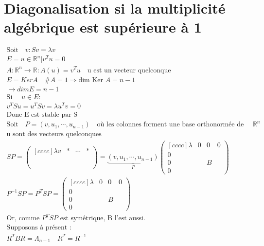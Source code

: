 \documentclass[a4paper]{book}
\begin{document}
\section{Diagonalisation si la multiplicité algébrique est supérieure à 1}
\begin{gather*}
    \text{Soit} \quad v : Sv = \lambda v \\
    E = {u \in \mathbb{R}^n | v^Tu = 0} \\
    A : \mathbb{R}^n \rightarrow \mathbb{R} : A(u) = v^Tu \quad \text{u est un vecteur quelconque} \\
    E = Ker A \quad \#A = 1 \Rightarrow \text{dim Ker } A = n-1 \\
    \rightarrow dim E = n-1 \\
    \text{Si } \quad u \in E : \\
    v^TSu = u^TSv = \lambda u^Tv = 0 \\
    \text{Donc E est stable par S} \\
    \text{Soit} \quad P = (v,u_1,\cdots,u_{n-1}) \quad \text{où les colonnes forment une base orthonormée de } \quad \mathbb{R}^n \\
    \text{u sont des vecteurs quelconques} \\
    SP = \begin{pmatrix}[cccc]
    \lambda v & * &\cdots &*\\
    \\
    \\
    \\
    \end{pmatrix} = \underbrace{(v,u_1,\cdots,u_{n-1})}_P\begin{pmatrix}[cccc]
    \lambda & 0 & 0 & 0 \\
    0&&& \\
    0&&B&\\
    0&&&
    \end{pmatrix} \\
    P^{-1}SP = P^TSP = \begin{pmatrix}[cccc]
    \lambda & 0 & 0 & 0 \\
    0&&& \\
    0&&B&\\
    0&&&
    \end{pmatrix}\\
    \text{Or, comme $P^TSP$ est symétrique, B l'est aussi.} \\
    \text{Supposons à présent :}\\
    R^TBR = \Lambda_{n-1} \quad R^T = R^{-1} \\

\end{gather*}
\end{document}
